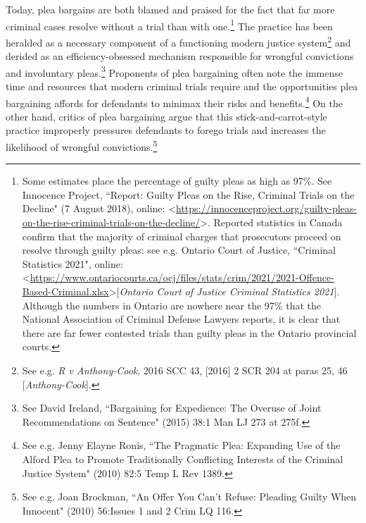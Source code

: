 Today, plea bargains are both blamed and praised for the fact that far more criminal cases resolve without a trial than with one.\footnote{Some estimates place the percentage of guilty pleas as high as 97\%. See Innocence Project, ``Report: Guilty Pleas on the Rise, Criminal Trials on the Decline" (7 August 2018), online: \textless \url{https://innocenceproject.org/guilty-pleas-on-the-rise-criminal-trials-on-the-decline/}\textgreater. Reported statistics in Canada confirm that the majority of criminal charges that prosecutors proceed on resolve through guilty pleas: see e.g. Ontario Court of Justice, ``Criminal Statistics 2021", online: \textless \url{https://www.ontariocourts.ca/ocj/files/stats/crim/2021/2021-Offence-Based-Criminal.xlsx}\textgreater \hspace{1mm}[\textit{Ontario Court of Justice Criminal Statistics 2021}]. Although the numbers in Ontario are nowhere near the 97\% that the National Association of Criminal Defense Lawyers reports, it is clear that there are far fewer contested trials than guilty pleas in the Ontario provincial courts.} The practice has been heralded as a necessary component of a functioning modern justice system\footnote{See e.g. \textit{R v Anthony-Cook}, 2016 SCC 43, [2016] 2 SCR 204 at paras 25, 46 [\textit{Anthony-Cook}].} and derided as an efficiency-obsessed mechanism responsible for wrongful convictions and involuntary pleas.\footnote{See David Ireland, ``Bargaining for Expedience: The Overuse of Joint Recommendations on Sentence" (2015) 38:1 Man LJ 273 at 275f.} Proponents of plea bargaining often note the immense time and resources that modern criminal trials require and the opportunities plea bargaining affords for defendants to minimax their risks and benefits.\footnote{See e.g. Jenny Elayne Ronis, ``The Pragmatic Plea: Expanding Use of the Alford Plea to Promote Traditionally Conflicting Interests of the Criminal Justice System" (2010) 82:5 Temp L Rev 1389.} On the other hand, critics of plea bargaining argue that this stick-and-carrot-style practice improperly pressures defendants to forego trials and increases the likelihood of wrongful convictions.\footnote{See e.g. Joan Brockman, ``An Offer You Can't Refuse: Pleading Guilty When Innocent" (2010) 56:Issues 1 and 2 Crim LQ 116.}

